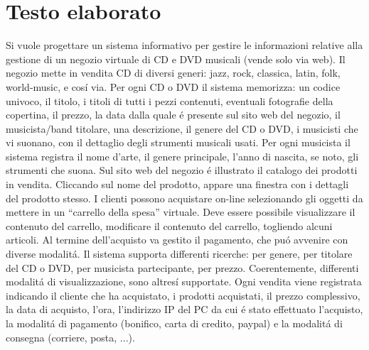 \documentclass[a4paper,titlepage]{book}
\begin{document}
\pagestyle{plain}

\begin{frontespizio}
\end{frontespizio}

\tableofcontents
\clearpage
\thispagestyle{empty}

\chapter{Testo elaborato}
Si vuole progettare un sistema informativo per gestire le informazioni relative alla gestione di un negozio
virtuale di CD e DVD musicali (vende solo via web).
Il negozio mette in vendita CD di diversi generi: jazz, rock, classica, latin, folk, world-music, e cos\'i via.
Per ogni CD o DVD il sistema memorizza: un codice univoco, il titolo, i titoli di tutti i pezzi contenuti,
eventuali fotografie della copertina, il prezzo, la data dalla quale \'e presente sul sito web del negozio, il
musicista/band titolare, una descrizione, il genere del CD o DVD, i musicisti che vi suonano, con il
dettaglio degli strumenti musicali usati. Per ogni musicista il sistema registra il nome d’arte, il genere
principale, l’anno di nascita, se noto, gli strumenti che suona.
Sul sito web del negozio \'e illustrato il catalogo dei prodotti in vendita.
Cliccando sul nome del prodotto, appare una finestra con i dettagli del prodotto stesso.
I clienti possono acquistare on-line selezionando gli oggetti da mettere in un “carrello della spesa”
virtuale.
Deve essere possibile visualizzare il contenuto del carrello, modificare il contenuto del carrello, togliendo
alcuni articoli.
Al termine dell’acquisto va gestito il pagamento, che pu\'o avvenire con diverse modalit\'a.
Il sistema supporta differenti ricerche: per genere, per titolare del CD o DVD, per musicista partecipante,
per prezzo. Coerentemente, differenti modalit\'a di visualizzazione, sono altres\'i supportate.
Ogni vendita viene registrata indicando il cliente che ha acquistato, i prodotti acquistati, il prezzo
complessivo, la data di acquisto, l’ora, l’indirizzo IP del PC da cui \'e stato effettuato l’acquisto, la modalit\'a
di pagamento (bonifico, carta di credito, paypal) e la modalit\'a di consegna (corriere, posta, ...).
\end{document}
